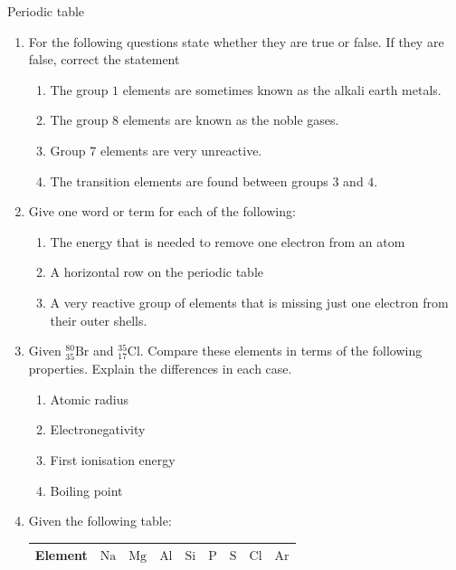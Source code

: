 \begin{eocexercises}{ Periodic table}
            \nopagebreak \noindent
\label{m38757*uid091221}\begin{enumerate}[noitemsep, label=\textbf{\arabic*}. ] 
\item For the following questions state whether they are true or false. If they are false, correct the statement
  \label{m38757*id073324}\begin{enumerate}[noitemsep, label=\textbf{\alph*}. ] 
  \item The group $1$ elements are sometimes known as the alkali earth metals.
  \item The group $8$ elements are known as the noble gases.
  \item Group $7$ elements are very unreactive.
  \item The transition elements are found between groups $3$ and $4$.\end{enumerate}
\item Give one word or term for each of the following:
   \label{m38757*id0734}\begin{enumerate}[noitemsep, label=\textbf{\alph*}. ] 
   \item The energy that is needed to remove one electron from an atom
   \item A horizontal row on the periodic table
   \item A very reactive group of elements that is missing just one electron from their outer shells.
   \end{enumerate}
\item Given $^{80}_{35}\text{Br}$ and $^{35}_{17}\text{Cl}$. Compare these elements in terms of the following properties. Explain the differences in each case.
  \begin{enumerate}[noitemsep, label=\textbf{\alph*}. ]
   \item Atomic radius
   \item Electronegativity
   \item First ionisation energy
   \item Boiling point
  \end{enumerate}
\item Given the following table:
  \begin{table}[H]
   \begin{center}
    \begin{tabular}{|l|l|l|l|l|l|l|l|l|} \hline
     \textbf{Element} & $\text{Na}$ & $\text{Mg}$ & $\text{Al}$ & $\text{Si}$ & $\text{P}$ & $\text{S}$ & $\text{Cl}$ & $\text{Ar}$ \\ \hline

\end{tabular}
\end{center}
\end{table}
\end{enumerate}
\end{eocexercises}
